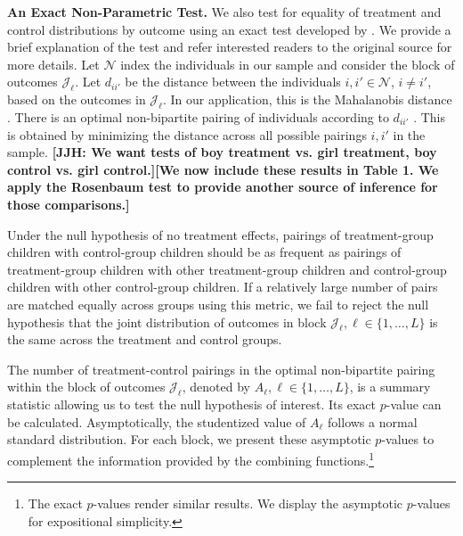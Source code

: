 \textbf{An Exact Non-Parametric Test.} We also test for equality of treatment and control distributions by outcome using an exact test developed by \citet{Rosenbaum_2005_Distribution_JRSS}. We provide a brief explanation of the test and refer interested readers to the original source for more details. Let $\mathcal{N}$ index the individuals in our sample and consider the block of outcomes $\mathcal{J}_\ell$. Let $d_{ii'}$ be the distance between the individuals $i, i' \in \mathcal{N}$, $i \neq i'$, based on the outcomes in $\mathcal{J}_\ell$. In our application, this is the Mahalanobis distance \citep{Mahalanobis_1936_PNISI}. There is an optimal non-bipartite pairing of individuals according to $d_{ii'}$ \citep{Derigs_1988_Solving_AOR}. This is obtained by minimizing the distance across all possible pairings $i, i'$ in the sample. \textbf{[JJH: We want tests of boy treatment vs. girl treatment, boy control vs. girl control.][We now include these results in Table 1. We apply the Rosenbaum test to provide another source of inference for those comparisons.]}

Under the null hypothesis of no treatment effects, pairings of treatment-group children with control-group children should be as frequent as pairings of treatment-group children with other treatment-group children and control-group children with other control-group children. If a relatively large number of pairs are matched equally across groups using this metric, we fail to reject the null hypothesis that the joint distribution of outcomes in block $\mathcal{J}_{\ell}, \ell \in \{1,\dots ,L\}$ is the same across the treatment and control groups.

The number of treatment-control pairings in the optimal non-bipartite pairing within the block of outcomes $\mathcal{J}_\ell$, denoted by $A_{\ell}, \ell \in \{1,\dots ,L\}$, is a summary statistic allowing us to test the null hypothesis of interest. Its exact $p$-value can be calculated. Asymptotically, the studentized value of $A_\ell$ follows a normal standard distribution. For each block, we present these asymptotic $p$-values to complement the information provided by the combining functions.\footnote{The exact $p$-values render similar results. We display the asymptotic $p$-values for expositional simplicity.}
